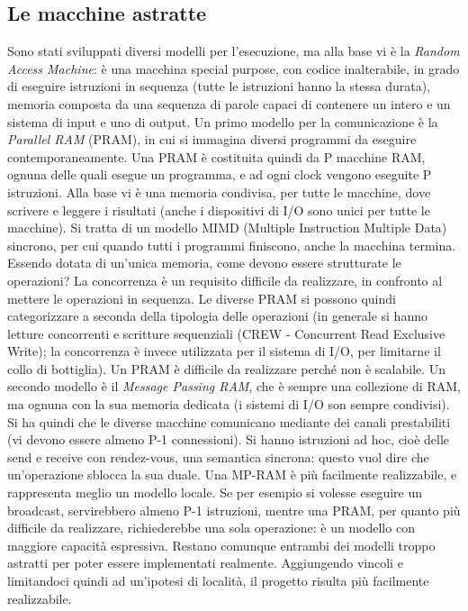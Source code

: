 \subsection{Le macchine astratte}
Sono stati sviluppati diversi modelli per l'esecuzione, ma alla base vi è la
\textit{Random Access Machine}: è una macchina special purpose, con codice 
inalterabile, in grado di eseguire istruzioni in sequenza (tutte le istruzioni 
hanno la stessa durata), memoria composta da una sequenza di parole capaci di 
contenere un intero e un sistema di input e uno di output.
Un primo modello per la comunicazione è la \textit{Parallel RAM} (PRAM), in cui 
si immagina diversi programmi da eseguire contemporaneamente. Una PRAM è 
costituita quindi da P macchine RAM, ognuna delle quali esegue un programma, e 
ad ogni clock vengono eseguite P istruzioni. Alla base vi è una memoria 
condivisa, per tutte le macchine, dove scrivere e leggere i risultati (anche i 
dispositivi di I/O sono unici per tutte le macchine). Si tratta di un modello 
MIMD (Multiple Instruction Multiple Data) sincrono, per cui quando tutti i 
programmi finiscono, anche la macchina termina. Essendo dotata di un'unica 
memoria, come devono essere strutturate le operazioni? La concorrenza è un 
requisito difficile da realizzare, in confronto al mettere le operazioni in 
sequenza. Le diverse PRAM si possono quindi categorizzare a seconda della 
tipologia delle operazioni (in generale si hanno letture concorrenti e scritture 
sequenziali (CREW - Concurrent Read Exclusive Write); la concorrenza è invece 
utilizzata per il sistema di I/O, per limitarne il collo di bottiglia). Un PRAM 
è difficile da realizzare perché non è scalabile.
Un secondo modello è il \textit{Message Passing RAM}, che è sempre una 
collezione di RAM, ma ognuna con la sua memoria dedicata (i sistemi di I/O son 
sempre condivisi). Si ha quindi che le diverse macchine comunicano mediante dei 
canali prestabiliti (vi devono essere almeno P-1 connessioni). Si hanno 
istruzioni ad hoc, cioè delle send e receive con rendez-vous, una semantica 
sincrona: questo vuol dire che un'operazione sblocca la sua duale. Una MP-RAM è 
più facilmente realizzabile, e rappresenta meglio un modello locale. Se per 
esempio si volesse eseguire un broadcast,
servirebbero almeno P-1 istruzioni, mentre una PRAM, per quanto più difficile 
da realizzare, richiederebbe una sola operazione: è un modello con maggiore 
capacità espressiva. Restano comunque entrambi dei modelli troppo astratti per
poter essere implementati realmente. Aggiungendo vincoli e limitandoci quindi ad un'ipotesi di località, il progetto
risulta più facilmente realizzabile.
